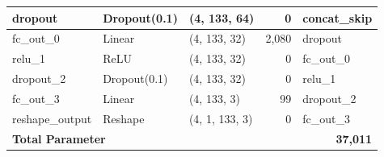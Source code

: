 \begin{table}[h]
\begin{tabular}{|l|l|l|r|l|}
        \hline
        dropout & Dropout(0.1) & (4, 133, 64) & 0 & concat\_skip \\
        \hline
        fc\_out\_0 & Linear & (4, 133, 32) & 2,080 & dropout \\
        \hline
        relu\_1 & ReLU & (4, 133, 32) & 0 & fc\_out\_0 \\
        \hline
        dropout\_2 & Dropout(0.1) & (4, 133, 32) & 0 & relu\_1 \\
        \hline
        fc\_out\_3 & Linear & (4, 133, 3) & 99 & dropout\_2 \\
        \hline
        reshape\_output & Reshape & (4, 1, 133, 3) & 0 & fc\_out\_3 \\
        \hline
        \hline
        \multicolumn{3}{|l|}{\textbf{Total Parameter}} & \multicolumn{2}{r|}{\textbf{37,011}} \\
        \hline
    \end{tabular}
\end{table}

